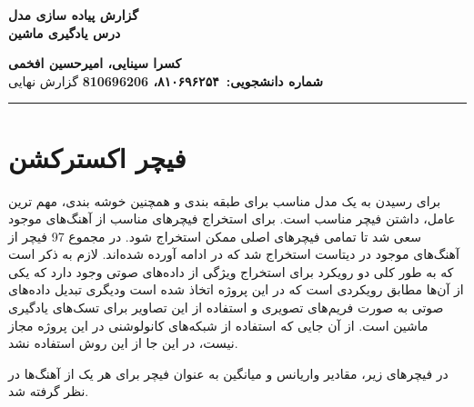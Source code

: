
\def \Subject {گزارش پیاده سازی مدل }
\def \Course {درس یادگیری ماشین}
\def \Author {کسرا سینایی، امیرحسین افخمی}
\def \Report {گزارش نهایی}
\def \StudentNumber {۸۱۰۶۹۶۲۵۴، 810696206}

\begin{center}
\vspace{.4cm}
{\bf {\huge \Subject}}\\
{\bf \Large \Course}
\vspace{.2cm}
\end{center}
{\bf \Author }  \\
{\bf شماره دانشجویی:\ \StudentNumber}
\hspace{\fill} 
{\Large \Report} \\
\hrule
\vspace{0.8cm}

\clearpage


\section{فیچر اکسترکشن}
برای رسیدن به یک مدل مناسب برای طبقه بندی و همچنین خوشه بندی، مهم ترین عامل، داشتن فیچر مناسب است.
برای استخراج فیچرهای مناسب از آهنگ‌های موجود سعی شد تا تمامی فیچرهای اصلی ممکن استخراج شود.
در مجموع 97 فیچر از آهنگ‌های موجود در دیتاست استخراج شد که در ادامه آورده شده‌اند.
لازم به ذکر است که به طور کلی دو رویکرد برای استخراج ویژگی از داده‌های صوتی وجود دارد که یکی از آن‌ها مطابق رویکردی است که در این پروژه اتخاذ شده است ودیگری 
تبدیل داده‌های صوتی به صورت فریم‌های تصویری و استفاده از این تصاویر برای تسک‌های یادگیری ماشین است.
از آن جایی که استفاده از شبکه‌های کانولوشنی در این پروژه مجاز نیست، در این جا از این روش استفاده نشد.

در فیچرهای زیر، مقادیر واریانس و میانگین به عنوان فیچر برای هر یک از آهنگ‌ها در نظر گرفته شد.

